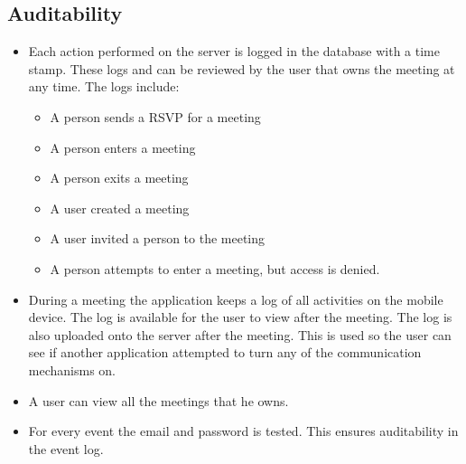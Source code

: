 \subsection{Auditability}
\begin{itemize}
\item Each action performed on the server is logged in the database with a time stamp. These logs  and can be reviewed by the user that owns the meeting at any time. The logs include:
\begin{itemize}
\item A person sends a RSVP for a meeting
\item A person enters a meeting
\item A person exits a meeting
\item A user created a meeting
\item A user invited a person to the meeting
\item A person attempts to enter a meeting, but access is denied.
\end{itemize}
\item During a meeting the application keeps a log of all activities on the mobile device. The log is available for the user to view after the meeting. The log is also uploaded onto the server after the meeting. This is used so the user can see if another application attempted to turn any of the communication mechanisms on.
\item A user can view all the meetings that he owns.
\item For every event the email and password is tested. This ensures auditability in the event log. 
\end{itemize}

